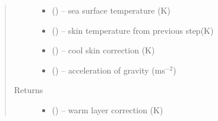 \documentclass[letterpaper,10pt,english]{sphinxmanual}
\begin{document}
\begin{fulllineitems}
\begin{quote}
\begin{description}
\begin{itemize}
\item {} 
 (\href{https://docs.python.org/3/library/functions.html\#float}{}) -- sea surface temperature (K)

\item {} 
 (\href{https://docs.python.org/3/library/functions.html\#float}{}) -- skin temperature from previous step(K)

\item {} 
 (\href{https://docs.python.org/3/library/functions.html\#float}{}) -- cool skin correction (K)

\item {} 
 (\href{https://docs.python.org/3/library/functions.html\#float}{}) -- acceleration of gravity (ms$^{-2}$)

\end{itemize}

\item[{Returns}] \leavevmode
\begin{itemize}
\item {} 
 (\href{https://docs.python.org/3/library/functions.html\#float}{}) -- warm layer correction (K)

\end{itemize}

\end{description}\end{quote}
\end{fulllineitems}

\end{document}
